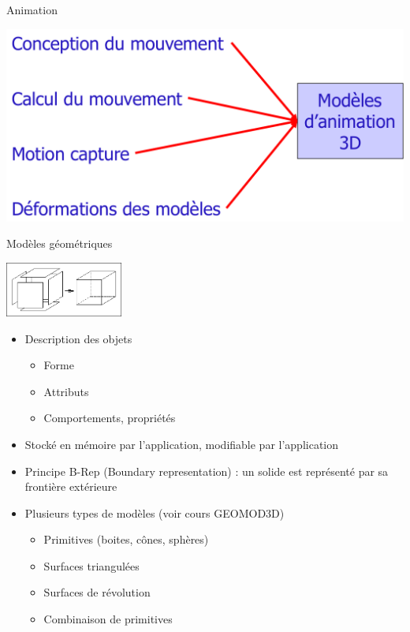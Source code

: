 \begin{frame}{Animation}
\begin{center}
\includegraphics[width=.9\textwidth]{figs/anim.png}
\end{center}

\end{frame}

\begin{frame}{Modèles géométriques}
\begin{center}
\includegraphics[height=1.8cm]{figs/brep.png}
\end{center}
\begin{itemize}
\item Description des objets
\begin{itemize}
\item Forme
\item Attributs
\item Comportements, propriétés
\end{itemize}
\item Stocké en mémoire par l'application, modifiable par l'application
\item Principe B-Rep (Boundary representation) : un solide est représenté par sa frontière extérieure
\item Plusieurs types de modèles (voir cours GEOMOD3D)
\begin{itemize}
\item Primitives (boites, cônes, sphères)
\item Surfaces triangulées
\item Surfaces de révolution
\item Combinaison de primitives
\end{itemize}
\end{itemize}
\end{frame}


